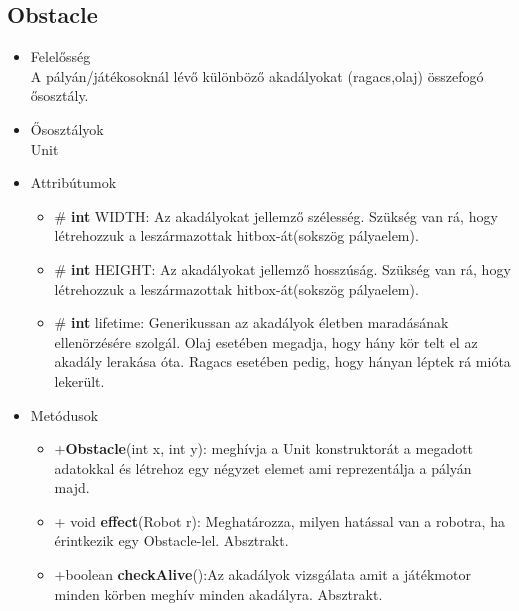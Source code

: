 \subsection{Obstacle}
\begin{itemize}
\item Felelősség\\
A pályán/játékosoknál lévő különböző akadályokat (ragacs,olaj) összefogó ősosztály.
\item Ősosztályok\\
Unit
\item Attribútumok
	\begin{itemize}
		\item \# \textbf{int} WIDTH: Az akadályokat jellemző szélesség. Szükség van rá, hogy létrehozzuk a leszármazottak hitbox-át(sokszög pályaelem).
		\item \# \textbf{int} HEIGHT: Az akadályokat jellemző hosszúság. Szükség van rá, hogy létrehozzuk a leszármazottak hitbox-át(sokszög pályaelem).
			\item \# \textbf{int} lifetime: Generikussan az akadályok életben maradásának ellenörzésére szolgál. Olaj esetében megadja, hogy hány kör telt el az akadály lerakása óta. Ragacs esetében pedig, hogy hányan léptek rá mióta lekerült. 
	\end{itemize}
\item Metódusok
	\begin{itemize}
		\item +\textbf{Obstacle}(int x, int y): meghívja a Unit konstruktorát a megadott adatokkal és létrehoz egy négyzet elemet ami reprezentálja a pályán majd.
		\item + void \textbf{effect}(Robot r): Meghatározza, milyen hatással van a robotra, ha érintkezik egy Obstacle-lel. Absztrakt.
		\item +boolean \textbf{checkAlive}():Az akadályok vizsgálata amit a játékmotor minden körben meghív minden akadályra. Absztrakt.
	\end{itemize}
\end{itemize}

